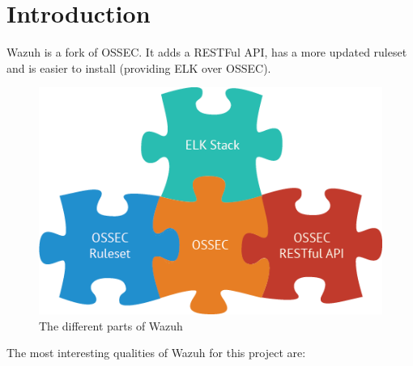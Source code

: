 \section{Introduction}
Wazuh is a fork of OSSEC. It adds a RESTFul API, has a more updated ruleset and is easier to install (providing ELK over OSSEC).
\begin{figure}[H]
  \centering
	\includegraphics[width=.6\textwidth]{figuras/wazuh_stack.png}
	\caption{The different parts of Wazuh\cite{wazuh_stack}}
\end{figure}
\linej
The most interesting qualities of Wazuh for this project are\cite{wazuh_index}\cite{wazuh_documentation}: %
